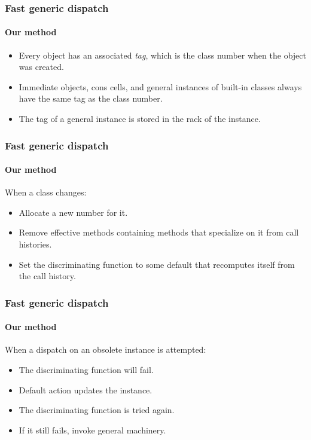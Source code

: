 \documentclass{beamer}
\begin{document}
\begin{frame}
  \frametitle{Fast generic dispatch}
  \framesubtitle{Our method}

  \begin{itemize}
  \item Every object has an associated \emph{tag}, which is the class
    number when the object was created.
  \item Immediate objects, cons cells, and general instances of
    built-in classes always have the same tag as the class number.
  \item The tag of a general instance is stored in the rack of the
    instance. 
  \end{itemize}

\end{frame}
\begin{frame}
  \frametitle{Fast generic dispatch}
  \framesubtitle{Our method}

  When a class changes:

  \begin{itemize}
  \item Allocate a new number for it.
  \item Remove effective methods containing methods that specialize on
    it from call histories.
  \item Set the discriminating function to some default that
    recomputes itself from the call history.
  \end{itemize}

\end{frame}
\begin{frame}
  \frametitle{Fast generic dispatch}
  \framesubtitle{Our method}

  When a dispatch on an obsolete instance is attempted:

  \begin{itemize}
  \item The discriminating function will fail.
  \item Default action updates the instance. 
  \item The discriminating function is tried again.
  \item If it still fails, invoke general machinery.
  \end{itemize}

\end{frame}
\end{document}
